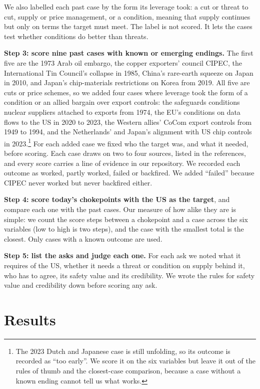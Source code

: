 \documentclass[11pt]{article}
\begin{document}
We also labelled each past case by the form its leverage took: a cut or threat to cut, supply or price management, or a condition, meaning that supply continues but only on terms the target must meet. The label is not scored. It lets the cases test whether conditions do better than threats.

\textbf{Step 3: score nine past cases with known or emerging endings.} The first five are the 1973 Arab oil embargo, the copper exporters' council CIPEC, the International Tin Council's collapse in 1985, China's rare-earth squeeze on Japan in 2010, and Japan's chip-materials restrictions on Korea from 2019. All five are cuts or price schemes, so we added four cases where leverage took the form of a condition or an allied bargain over export controls: the safeguards conditions nuclear suppliers attached to exports from 1974, the EU's conditions on data flows to the US in 2020 to 2023, the Western allies' CoCom export controls from 1949 to 1994, and the Netherlands' and Japan's alignment with US chip controls in 2023.\footnote{The 2023 Dutch and Japanese case is still unfolding, so its outcome is recorded as ``too early''. We score it on the six variables but leave it out of the rules of thumb and the closest-case comparison, because a case without a known ending cannot tell us what works.} For each added case we fixed who the target was, and what it needed, before scoring. Each case draws on two to four sources, listed in the references, and every score carries a line of evidence in our repository. We recorded each outcome as worked, partly worked, failed or backfired. We added ``failed'' because CIPEC never worked but never backfired either.

\textbf{Step 4: score today's chokepoints with the US as the target}, and compare each one with the past cases. Our measure of how alike they are is simple: we count the score steps between a chokepoint and a case across the six variables (low to high is two steps), and the case with the smallest total is the closest. Only cases with a known outcome are used.

\textbf{Step 5: list the asks and judge each one.} For each ask we noted what it requires of the US, whether it needs a threat or condition on supply behind it, who has to agree, its safety value and its credibility. We wrote the rules for safety value and credibility down before scoring any ask.

\section{Results}
\end{document}
